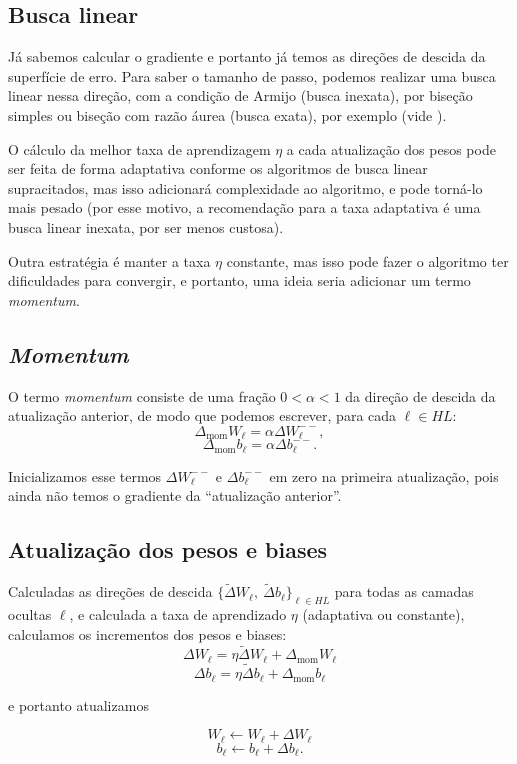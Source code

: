\documentclass[12pt,a4paper]{article}
\begin{document}
\subsection{Busca linear}
Já sabemos calcular o gradiente e portanto já temos as direções de descida da superfície de erro. Para saber o tamanho de passo, podemos realizar uma busca linear nessa direção, com a condição de Armijo (busca inexata), por biseção simples ou biseção com razão áurea (busca exata), por exemplo (vide \cite[Seção 4.2.2]{karas}). 

O cálculo da melhor taxa de aprendizagem $\eta$ a cada atualização dos pesos pode ser feita de forma adaptativa conforme os algoritmos de busca linear supracitados, mas isso adicionará complexidade ao algoritmo, e pode torná-lo mais pesado (por esse motivo, a recomendação para a taxa adaptativa é uma busca linear inexata, por ser menos custosa).

Outra estratégia é manter a taxa $\eta$ constante, mas isso pode fazer o algoritmo ter dificuldades para convergir, e portanto, uma ideia seria adicionar um termo \textit{momentum}.

\subsection{\textit{Momentum}}
O termo \textit{momentum} consiste de uma fração $0<\alpha<1$ da direção de descida da atualização anterior, de modo que podemos escrever, para cada $\ell\in HL$:
\[
\Delta_{\text{mom}}W_\ell = \alpha \Delta W_\ell^{--},
\]
\[
\Delta_{\text{mom}} b_\ell = \alpha  \Delta b_\ell^{--}.
\]

Inicializamos esse termos $\Delta W_\ell^{--}$ e $\Delta b_\ell^{--}$ em zero na primeira atualização, pois ainda não temos o gradiente da ``atualização anterior''.


\subsection{Atualização dos pesos e biases}
Calculadas as direções de descida $\{\tilde\Delta W_\ell,\ \tilde\Delta b_\ell\}_{\ell\in HL}$ para todas as camadas ocultas $\ell$, e calculada a taxa de aprendizado $\eta$ (adaptativa ou constante), calculamos os incrementos dos pesos e biases:
\[
\Delta W_\ell = \eta \tilde\Delta W_\ell+\Delta_{\text{mom}}W_\ell
\]
\[
\Delta b_\ell = \eta \tilde\Delta b_\ell+\Delta_{\text{mom}}b_\ell
\]

e portanto atualizamos

\[
W_\ell \gets W_\ell +\Delta W_\ell
\]
\[
b_\ell  \gets b_\ell + \Delta b_\ell.
\]
\end{document}
